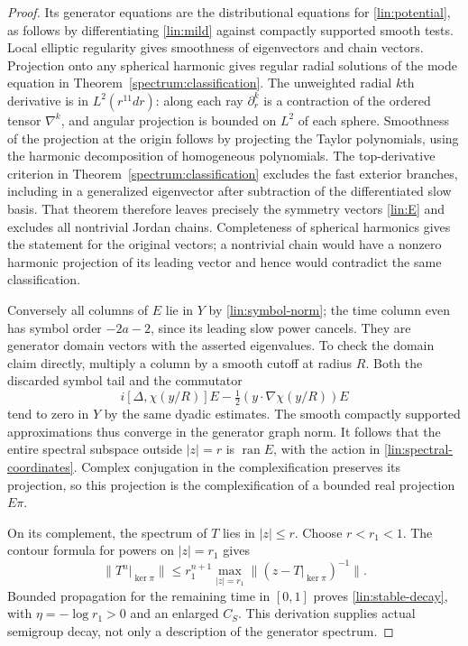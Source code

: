 \begin{proof}
Its generator equations are the distributional equations for
\eqref{lin:potential}, as follows by differentiating
\eqref{lin:mild} against compactly supported smooth tests.  Local
elliptic regularity gives smoothness of eigenvectors and chain
vectors.  Projection onto any spherical harmonic gives regular
radial solutions of the mode equation in
Theorem~\ref{spectrum:classification}.  The unweighted radial $k$th
derivative is in $L^2(r^{11}dr)$: along each ray $\partial_r^k$ is a
contraction of the ordered tensor $\nabla^k$, and angular projection
is bounded on $L^2$ of each sphere.  Smoothness of the projection at
the origin follows by projecting the Taylor polynomials, using the
harmonic decomposition of homogeneous polynomials.  The
top-derivative criterion in Theorem~\ref{spectrum:classification}
excludes the fast exterior branches, including in a generalized
eigenvector after subtraction of the differentiated slow basis.
That theorem therefore leaves precisely the symmetry vectors
\eqref{lin:E} and excludes all nontrivial Jordan chains.  Completeness
of spherical harmonics gives the statement for the original vectors;
a nontrivial chain would have a nonzero harmonic projection of its
leading vector and hence would contradict the same classification.

Conversely all columns of $E$ lie in $Y$ by
\eqref{lin:symbol-norm}; the time column even has symbol order
$-2a-2$, since its leading slow power cancels.  They are generator
domain vectors with the asserted eigenvalues.  To check the domain
claim directly, multiply a column by a smooth cutoff at radius $R$.
Both the discarded symbol tail and the commutator
\[
 i[\Delta,\chi(y/R)]E-\tfrac12(y\cdot\nabla\chi(y/R))E
\]
tend to zero in $Y$ by the same dyadic estimates.  The smooth compactly
supported approximations thus converge in the generator graph norm.
It follows that the entire spectral subspace outside $|z|=r$ is
$\operatorname{ran}E$, with the action in
\eqref{lin:spectral-coordinates}.  Complex conjugation in the
complexification preserves its projection, so this projection is the
complexification of a bounded real projection $E\pi$.

On its complement, the spectrum of $T$ lies in $|z|\le r$.  Choose
$r<r_1<1$.  The contour formula for powers on $|z|=r_1$ gives
\[
 \|T^n|_{\ker\pi}\|
 \le r_1^{n+1}\max_{|z|=r_1}
                  \|(z-T|_{\ker\pi})^{-1}\|.
\]
Bounded propagation for the remaining time in $[0,1]$ proves
\eqref{lin:stable-decay}, with $\eta=-\log r_1>0$ and an enlarged
$C_S$.  This derivation supplies actual semigroup decay, not only a
description of the generator spectrum.
\end{proof}

